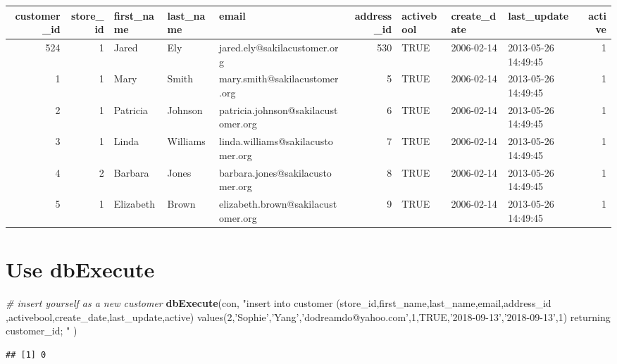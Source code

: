 \documentclass[]{book}
\newenvironment{Shaded}{\begin{snugshade}}{\end{snugshade}}
\newcommand{\CommentTok}[1]{\textcolor[rgb]{0.56,0.35,0.01}{\textit{#1}}}
\newcommand{\KeywordTok}[1]{\textcolor[rgb]{0.13,0.29,0.53}{\textbf{#1}}}
\newcommand{\NormalTok}[1]{#1}
\newcommand{\StringTok}[1]{\textcolor[rgb]{0.31,0.60,0.02}{#1}}
\theoremstyle{definition}
\theoremstyle{definition}
\theoremstyle{definition}
\theoremstyle{remark}
\begin{document}
\begin{tabular}{r|r|l|l|l|r|l|l|l|r}
\hline
customer\_id & store\_id & first\_name & last\_name & email & address\_id & activebool & create\_date & last\_update & active\\
\hline
524 & 1 & Jared & Ely & jared.ely@sakilacustomer.org & 530 & TRUE & 2006-02-14 & 2013-05-26 14:49:45 & 1\\
\hline
1 & 1 & Mary & Smith & mary.smith@sakilacustomer.org & 5 & TRUE & 2006-02-14 & 2013-05-26 14:49:45 & 1\\
\hline
2 & 1 & Patricia & Johnson & patricia.johnson@sakilacustomer.org & 6 & TRUE & 2006-02-14 & 2013-05-26 14:49:45 & 1\\
\hline
3 & 1 & Linda & Williams & linda.williams@sakilacustomer.org & 7 & TRUE & 2006-02-14 & 2013-05-26 14:49:45 & 1\\
\hline
4 & 2 & Barbara & Jones & barbara.jones@sakilacustomer.org & 8 & TRUE & 2006-02-14 & 2013-05-26 14:49:45 & 1\\
\hline
5 & 1 & Elizabeth & Brown & elizabeth.brown@sakilacustomer.org & 9 & TRUE & 2006-02-14 & 2013-05-26 14:49:45 & 1\\
\hline
\end{tabular}

\hypertarget{use-dbexecute}{%
\section{Use dbExecute}\label{use-dbexecute}}

\begin{Shaded}
\begin{Highlighting}[]
\CommentTok{# insert yourself as a new customer}
\KeywordTok{dbExecute}\NormalTok{(con,}
  \StringTok{"insert into customer }
\StringTok{  (store_id,first_name,last_name,email,address_id}
\StringTok{  ,activebool,create_date,last_update,active)}
\StringTok{  values(2,'Sophie','Yang','dodreamdo@yahoo.com',1,TRUE,'2018-09-13','2018-09-13',1)}
\StringTok{  returning customer_id;}
\StringTok{  "}
\NormalTok{  )}
\end{Highlighting}
\end{Shaded}

\begin{verbatim}
## [1] 0
\end{verbatim}
\end{document}
